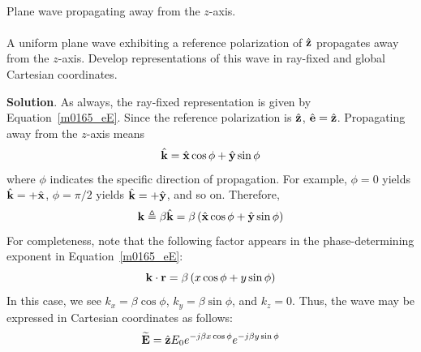 ~\\ \begin{example} 
\begin{mdframed}[backgroundcolor=brown!20,linecolor=brown!20]\raggedright
Plane wave propagating away from the $z$-axis.
\\~\\
A uniform plane wave exhibiting a reference polarization of $\hat{\bf z}$ propagates away from the $z$-axis.
Develop representations of this wave in ray-fixed and global Cartesian coordinates.

{\bf Solution}.
As always, the ray-fixed representation is given by Equation~\ref{m0165_eE}.
Since the reference polarization is $\hat{\bf z}$, $\hat{\bf e}=\hat{\bf z}$.
Propagating away from the $z$-axis means
%
\begin{equation}
\hat{\bf k} = \hat{\bf x}\cos\phi + \hat{\bf y}\sin\phi 
\end{equation}
%
where $\phi$ indicates the specific direction of propagation.
For example, 
$\phi=0$ yields $\hat{\bf k}=+\hat{\bf x}$,
$\phi=\pi/2$ yields $\hat{\bf k}=+\hat{\bf y}$,
and so on.
Therefore, 
%
\begin{equation}
{\bf k} \triangleq \beta\hat{\bf k} = \beta\left( \hat{\bf x}\cos\phi + \hat{\bf y}\sin\phi \right)  
\end{equation}
%
For completeness, note that the following factor appears in the phase-determining exponent in Equation~\ref{m0165_eE}: 
%
\begin{equation}
{\bf k}\cdot{\bf r} = \beta\left( x\cos\phi + y\sin\phi \right) 
\end{equation}
%
In this case, we see $k_x=\beta \cos\phi$, $k_y=\beta \sin\phi$, and $k_z=0$.
Thus, the wave may be expressed in Cartesian coordinates as follows:
%
\begin{equation}
\widetilde{\bf E} = \hat{\bf z} E_0 e^{-j\beta x \cos\phi} e^{-j\beta y \sin\phi} 
\end{equation}
%
\end{mdframed}
\end{example}




